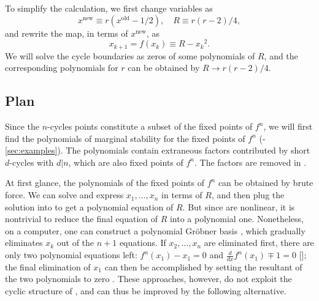 \documentclass{ws-ijbc}
\begin{document}
To simplify the calculation, we first change variables \cite{mandelbrot, brown1} as
%
\[
    x^{\mathrm{new}} \equiv r(x^{\mathrm{old}} - 1/2),
    \quad R \equiv r(r-2)/4,
\]
%
and rewrite the map, in terms of $x^{\mathrm{new}}$, as
%
\begin{equation}
  x_{k+1} = f(x_k) \equiv R - {x_k}^2.
\label{eq:logmaps}
\end{equation}
%
%
We will solve the cycle boundaries as zeros of some polynomials of $R$,
and the corresponding polynomials for $r$ can be obtained by $R \rightarrow r(r-2)/4$.
%
%






\subsection{Plan}

Since the $n$-cycles points constitute
  a subset of the fixed points of $f^n$,
we will first find
  the polynomials of marginal stability
  for the fixed points of $f^n$
  (-\ref{sec:examples}).
The polynomials contain
  extraneous factors contributed by short $d$-cycles with $d|n$,
  which are also fixed points of $f^n$.
The factors are removed in .


At first glance, the polynomials of the fixed points of $f^n$
  can be obtained by brute force.
We can solve
   and express $x_1, \ldots, x_n$
  in terms of $R$,
  and then plug the solution into 
  to get a polynomial equation of $R$.
But since  are nonlinear,
  it is nontrivial to reduce the final equation of $R$
  into a polynomial one.
Nonetheless, on a computer, one can
  construct a polynomial Gr\"obner basis \cite{kk1},
  which gradually eliminates $x_k$ out of the $n+1$ equations.
If $x_2, \dots, x_n$ are eliminated first,
  there are only two polynomial equations left:
  $f^n(x_1) - x_1 = 0$
  and
  $\frac{d}{dx}f^n (x_1) \mp 1 = 0$
  [];
  the final elimination of $x_1$ can then be accomplished
  by setting the resultant of the two polynomials
  to zero \cite{burm}.
%
These approaches, however, do not
  exploit the cyclic structure of ,
  and can thus be improved by the following alternative.
\end{document}
